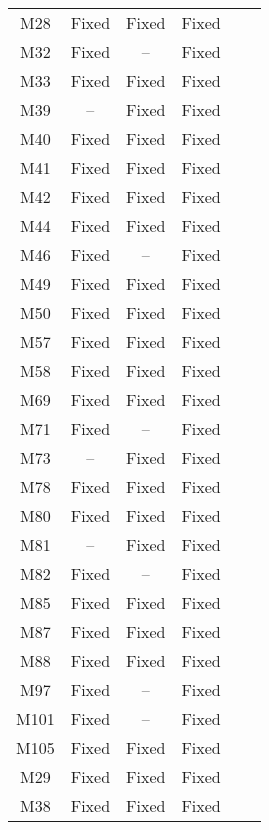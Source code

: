 \begin{table}[!t]
{\begin{tabular}{|c|c|c|c|c|c|}
M28               & Fixed     & Fixed     &Fixed   \\
M32               & Fixed     & --        &Fixed   \\
M33               & Fixed     & Fixed     &Fixed   \\
M39               & --        & Fixed     &Fixed   \\
M40               & Fixed     & Fixed     &Fixed   \\
M41               & Fixed     & Fixed     &Fixed   \\
M42               & Fixed     & Fixed     &Fixed   \\
M44               & Fixed     & Fixed     &Fixed   \\
M46               & Fixed     & --        &Fixed   \\
M49               & Fixed     & Fixed     &Fixed   \\
M50               & Fixed     & Fixed     &Fixed   \\
M57               & Fixed     & Fixed     &Fixed   \\
M58               & Fixed     & Fixed     &Fixed   \\
M69               & Fixed     & Fixed     &Fixed   \\
M71               & Fixed     & --        &Fixed   \\
M73               & --        & Fixed     &Fixed   \\
M78               & Fixed     & Fixed     &Fixed   \\
M80               & Fixed     & Fixed     &Fixed   \\
M81               & --        & Fixed     &Fixed   \\
M82               & Fixed     & --        &Fixed   \\
M85               & Fixed     & Fixed     &Fixed   \\
M87               & Fixed     & Fixed     &Fixed   \\
M88               & Fixed     & Fixed     &Fixed   \\
M97               & Fixed     & --        &Fixed   \\
M101              & Fixed     & --        &Fixed   \\
M105              & Fixed     & Fixed     &Fixed   \\
\hline
M29               & Fixed     & Fixed     &Fixed   \\
M38               & Fixed     & Fixed     &Fixed   \\

\end{tabular}}
\end{table}

